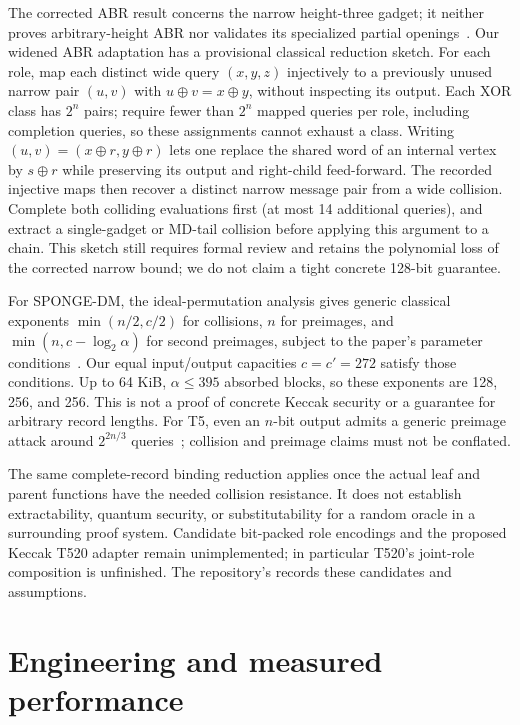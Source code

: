 \documentclass[11pt,letterpaper]{article}
\theoremstyle{definition} %
\begin{document}
The corrected ABR result concerns the narrow height-three gadget; it
neither proves arbitrary-height ABR nor validates its specialized partial
openings~\cite{DDN22}. Our widened ABR adaptation has a provisional
classical reduction sketch. For each role, map each distinct wide query
$(x,y,z)$ injectively to a previously unused narrow pair $(u,v)$ with
$u\oplus v=x\oplus y$, without inspecting its output. Each XOR class
has $2^n$ pairs; require fewer than $2^n$ mapped queries per role,
including completion queries, so these assignments cannot exhaust a class.
Writing $(u,v)=(x\oplus r,y\oplus r)$ lets one replace
the shared word of an internal vertex by $s\oplus r$ while preserving
its output and right-child feed-forward. The recorded injective maps then
recover a distinct narrow message pair from a wide collision. Complete
both colliding evaluations first (at most 14 additional queries), and
extract a single-gadget or MD-tail collision before applying this argument
to a chain. This sketch still requires formal review and retains the
polynomial loss of the corrected narrow bound; we do not claim a tight
concrete 128-bit guarantee.

For SPONGE-DM, the ideal-permutation analysis gives generic classical
exponents $\min(n/2,c/2)$ for collisions, $n$ for preimages, and
$\min(n,c-\log_2\alpha)$ for second preimages, subject to the paper's
parameter conditions~\cite{SPONGEDM}. Our equal input/output capacities
$c=c'=272$ satisfy those conditions. Up to 64 KiB, $\alpha\leq395$
absorbed blocks, so these exponents are 128, 256, and 256. This is not
a proof of concrete Keccak security or a guarantee for arbitrary record
lengths. For T5, even an $n$-bit output admits a generic preimage attack
around $2^{2n/3}$ queries~\cite{DKMN21}; collision and preimage claims
must not be conflated.

The same complete-record binding reduction applies once the actual leaf
and parent functions have the needed collision resistance. It does not
establish extractability, quantum security, or substitutability for a
random oracle in a surrounding proof system. Candidate bit-packed role
encodings and the proposed Keccak T520 adapter remain unimplemented; in
particular T520's joint-role composition is unfinished. The repository's
 records these candidates and assumptions.

\section{Engineering and measured performance}
\label{sec:measurements}
\end{document}
